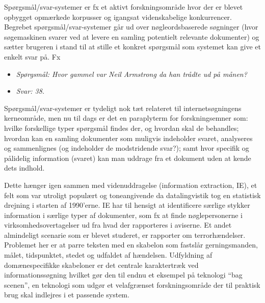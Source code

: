 \begin{multicols}{2}

Sp\o rgsm\aa l/svar-systemer er fx et aktivt forskningsomr\aa de hvor der er blevet opbygget opm\ae rkede korpusser og igangsat videnskabelige konkurrencer. Begrebet sp\o rgsm\aa l/svar-systemer g\aa r ud over n\o gleordsbaserede s\o gninger (hvor s\o gemaskinen svarer ved at levere en samling potentielt relevante dokumenter) og s\ae tter brugeren i stand til at stille et konkret sp\o rgsm\aa l som systemet kan give et enkelt svar \mbox{p\aa}. Fx

\begin{itemize}
\item[] \textit{Sp\o rgsm\aa l: Hvor gammel var Neil Armstrong da han tr\aa dte ud \mbox{p\aa} m\aa nen?}
\item[] \textit{Svar: 38.}
\end{itemize}

Sp\o rgsm\aa l/svar-systemer er tydeligt nok t\ae t relateret til internets\o gningens kerneomr\aa de, men nu til dags er det en paraplyterm for forskningsemner som: hvilke forskellige typer sp\o rgsm\aa l findes der, og hvordan skal de behandles; hvordan kan en samling dokumenter som muligvis indeholder svaret, analyseres og sammenlignes (og indeholder de modstridende svar?); samt hvor specifik og p\aa lidelig information (svaret) kan man uddrage fra et dokument uden at kende dets indhold. 


Dette h\ae nger igen sammen med videnuddragelse (information extraction, IE), et felt som var utroligt popul\ae rt og toneangivende da datalingvistik tog en stati\-stisk drejning i starten af 1990'erne. IE har til hensigt at identificere s\ae rlige stykker information i s\ae rlige typer af dokumenter, som fx at finde n\o glepersonerne i virksomhedsovertagelser ud fra hvad der rapporteres i avi\-serne. Et andet almindeligt scenarie som er blevet studeret, er rapporter om ter\-ror\-h\ae ndelser. Problemet her er at parre teksten med en skabelon som fastsl\aa r gerningsmanden, m\aa let, tidspunktet, stedet og udfaldet af h\ae ndelsen. Udfyldning af dom\ae nespecifikke skabeloner er det centrale karaktertr\ae k ved informationss\o gning hvilket g\o r den til endnu et eksempel \mbox{p\aa} teknologi ``bag scenen'', en teknologi som udg\o r et velafgr\ae nset forskningsomr\aa de der til praktisk brug skal indlejres i et passende system. 


\end{multicols}
